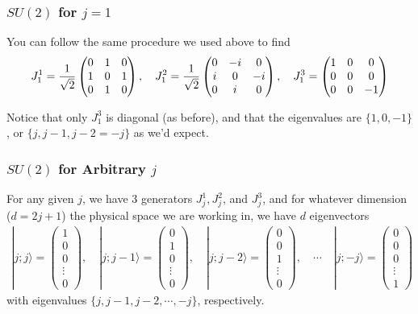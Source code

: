 \documentclass[12pt,epsf]{article}
\def\nolabel{\nonumber }
\def\nolabel{\nonumber }
\begin{document}
\subsubsection{$SU(2)$ for $j=1$}

You can follow the same procedure we used above to find
\begin{eqnarray}
J^1_1 = {1\over \sqrt{2}}
\begin{pmatrix}
0 & 1 & 0 \\ 1 & 0 & 1 \\ 0 & 1 & 0
\end{pmatrix}, \quad
J^2_1 = {1\over \sqrt{2}}
\begin{pmatrix}
0 & -i & 0 \\ i & 0 & -i \\ 0 & i & 0
\end{pmatrix}, \quad 
J^3_1 = 
\begin{pmatrix}
1 & 0 & 0 \\ 0 & 0 & 0 \\ 0 & 0 & -1
\end{pmatrix} \label{eq:su2adjoint}
\end{eqnarray}

Notice that only $J^3_1$ is diagonal (as before), and that the
eigenvalues are $\{1,0,-1\}$, or $\{j,j-1,j-2=-j\}$ as we'd expect.  

\subsubsection{$SU(2)$ for Arbitrary $j$}
\label{sec:arbitraryj}

For any given $j$, we have 3 generators $J^1_j,J^2_j$, and $J^3_j$,
and for whatever dimension ($d=2j+1$) the physical space we are working
in, we have $d$ eigenvectors
\begin{eqnarray}
|j;j\rangle = 
\begin{pmatrix}
1 \\ 0 \\ 0 \\ \vdots \\ 0
\end{pmatrix}, \quad |j;j-1\rangle = 
\begin{pmatrix}
0 \\ 1 \\ 0 \\ \vdots \\ 0
\end{pmatrix}, \quad |j;j-2\rangle = 
\begin{pmatrix}
0 \\ 0 \\ 1 \\ \vdots \\ 0
\end{pmatrix}, \quad \cdots \quad |j;-j\rangle = 
\begin{pmatrix}
0 \\ 0 \\ 0 \\ \vdots \\ 1
\end{pmatrix}\nolabel
\end{eqnarray}
with eigenvalues $\{j,j-1,j-2,\cdots, -j\}$, respectively.  
\end{document}
